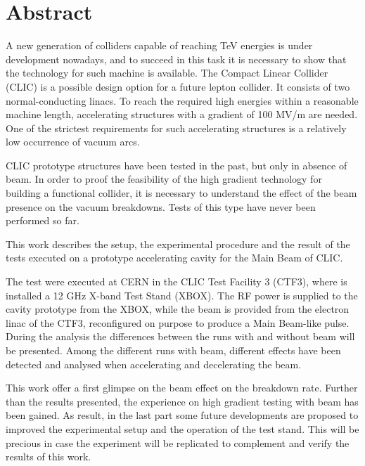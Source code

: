 \chapter*{Abstract}

A new generation of colliders capable of reaching TeV energies is under development nowadays, and to succeed in this task it is necessary to show that the technology for such machine is available. The Compact Linear Collider (CLIC) is a possible design option for a future lepton collider. It consists of two normal-conducting linacs. To reach the required high energies within a reasonable machine length, accelerating structures with a gradient of 100 MV/m are needed. One of the strictest requirements for such accelerating structures is a relatively low occurrence of vacuum arcs. 

CLIC prototype structures have been tested in the past, but only in absence of beam. In order to proof the feasibility of the high gradient technology for building a functional collider, it is necessary to understand the effect of the beam presence on the vacuum breakdowns. Tests of this type have never been performed so far. 

This work describes the setup, the experimental procedure and the result of the tests executed on a prototype accelerating cavity for the Main Beam of CLIC. 

The test were executed at CERN in the CLIC Test Facility 3 (CTF3), where is installed a 12 GHz X-band Test Stand (XBOX). The RF power is supplied to the cavity prototype from the XBOX, while the beam is provided from the electron linac of the CTF3, reconfigured on purpose to produce a Main Beam-like pulse. 
During the analysis the differences between the runs with and without beam will be presented. Among the different runs with beam, different effects have been detected and analysed when accelerating and decelerating the beam. 

This work offer a first glimpse on the beam effect on the breakdown rate. Further than the results presented, the experience on high gradient testing with beam has been gained. As result, in the last part some future developments are proposed to improved the experimental setup and the operation of the test stand. This will be precious in case the experiment will be replicated to complement and verify the results of this work. 